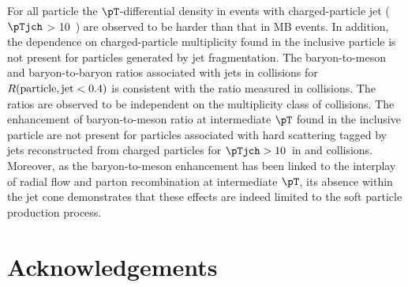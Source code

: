 \documentclass[ALICE,manyauthors]{cernphprep}
\begin{document}
For all particle the $\pT$-differential density in events with charged-particle jet ($\pTjch$ > 10~\GeVc) are observed to be harder than that in MB events.
In addition, the dependence on charged-particle multiplicity found in the inclusive particle is not present for particles generated by jet fragmentation.
The baryon-to-meson and baryon-to-baryon ratios associated with jets in \pPb collisions for $R({\rm particle, jet} < 0.4)$ is consistent with the ratio measured in \pp collisions.
The ratios are observed to be independent on the multiplicity class of \pPb collisions.
The enhancement of baryon-to-meson ratio at intermediate $\pT$ found in the inclusive particle are not present for particles associated with hard scattering tagged by jets reconstructed from charged particles for $\pTjch > 10$~\GeVc in \pp and \pPb collisions.
Moreover, as the baryon-to-meson enhancement has been linked to the interplay of radial flow and parton recombination at intermediate $\pT$, its absence within the jet cone demonstrates that these effects are indeed limited to the soft particle production process.


\newenvironment{acknowledgement}{\relax}{\relax}
\begin{acknowledgement}
\section*{Acknowledgements}
%

\end{acknowledgement}




\newpage
\appendix
\end{document}
